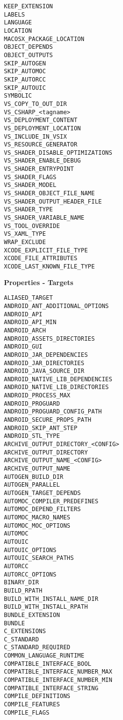 \documentclass{article}
\begin{document}
\begin{minipage}[t]{0.18\linewidth}
\begin{verbatim}
KEEP_EXTENSION
LABELS
LANGUAGE
LOCATION
MACOSX_PACKAGE_LOCATION
OBJECT_DEPENDS
OBJECT_OUTPUTS
SKIP_AUTOGEN
SKIP_AUTOMOC
SKIP_AUTORCC
SKIP_AUTOUIC
SYMBOLIC
VS_COPY_TO_OUT_DIR
VS_CSHARP_<tagname>
VS_DEPLOYMENT_CONTENT
VS_DEPLOYMENT_LOCATION
VS_INCLUDE_IN_VSIX
VS_RESOURCE_GENERATOR
VS_SHADER_DISABLE_OPTIMIZATIONS
VS_SHADER_ENABLE_DEBUG
VS_SHADER_ENTRYPOINT
VS_SHADER_FLAGS
VS_SHADER_MODEL
VS_SHADER_OBJECT_FILE_NAME
VS_SHADER_OUTPUT_HEADER_FILE
VS_SHADER_TYPE
VS_SHADER_VARIABLE_NAME
VS_TOOL_OVERRIDE
VS_XAML_TYPE
WRAP_EXCLUDE
XCODE_EXPLICIT_FILE_TYPE
XCODE_FILE_ATTRIBUTES
XCODE_LAST_KNOWN_FILE_TYPE
\end{verbatim}

\textbf{Properties - Targets}
\begin{verbatim}
ALIASED_TARGET
ANDROID_ANT_ADDITIONAL_OPTIONS
ANDROID_API
ANDROID_API_MIN
ANDROID_ARCH
ANDROID_ASSETS_DIRECTORIES
ANDROID_GUI
ANDROID_JAR_DEPENDENCIES
ANDROID_JAR_DIRECTORIES
ANDROID_JAVA_SOURCE_DIR
ANDROID_NATIVE_LIB_DEPENDENCIES
ANDROID_NATIVE_LIB_DIRECTORIES
ANDROID_PROCESS_MAX
ANDROID_PROGUARD
ANDROID_PROGUARD_CONFIG_PATH
ANDROID_SECURE_PROPS_PATH
ANDROID_SKIP_ANT_STEP
ANDROID_STL_TYPE
ARCHIVE_OUTPUT_DIRECTORY_<CONFIG>
ARCHIVE_OUTPUT_DIRECTORY
ARCHIVE_OUTPUT_NAME_<CONFIG>
ARCHIVE_OUTPUT_NAME
AUTOGEN_BUILD_DIR
AUTOGEN_PARALLEL
AUTOGEN_TARGET_DEPENDS
AUTOMOC_COMPILER_PREDEFINES
AUTOMOC_DEPEND_FILTERS
AUTOMOC_MACRO_NAMES
AUTOMOC_MOC_OPTIONS
AUTOMOC
AUTOUIC
AUTOUIC_OPTIONS
AUTOUIC_SEARCH_PATHS
AUTORCC
AUTORCC_OPTIONS
BINARY_DIR
BUILD_RPATH
BUILD_WITH_INSTALL_NAME_DIR
BUILD_WITH_INSTALL_RPATH
BUNDLE_EXTENSION
BUNDLE
C_EXTENSIONS
C_STANDARD
C_STANDARD_REQUIRED
COMMON_LANGUAGE_RUNTIME
COMPATIBLE_INTERFACE_BOOL
COMPATIBLE_INTERFACE_NUMBER_MAX
COMPATIBLE_INTERFACE_NUMBER_MIN
COMPATIBLE_INTERFACE_STRING
COMPILE_DEFINITIONS
COMPILE_FEATURES
COMPILE_FLAGS
\end{verbatim}
\end{minipage}
\hfill\vline\hfill
\end{document}
